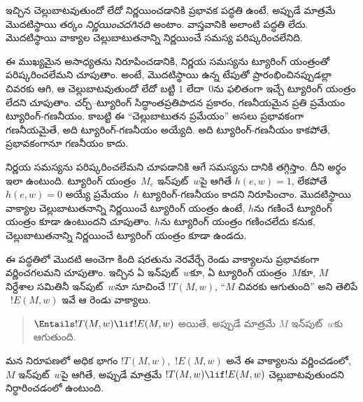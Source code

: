 \documentclass[../../../include/open-logic-section]{subfiles}
\begin{document}

ఇచ్చిన  చెల్లుబాటవుతుందో లేదో నిర్ణయించడానికి ప్రభావక పద్ధతి
ఉంటే, అప్పుడే మాత్రమే మొదటిస్థాయి తర్కం \emph{నిర్ణయించదగినది} అంటాం.
వాస్తవానికి అలాంటి పద్ధతి లేదు. మొదటిస్థాయి వాక్యాల చెల్లుబాటుతనాన్ని
నిర్ణయించే సమస్య పరిష్కరించలేనిది.

ఈ ముఖ్యమైన అసాధ్యతను నిరూపించడానికి, నిర్ణయ సమస్యను ట్యూరింగ్ యంత్రంతో
పరిష్కరించలేమని చూపుతాం. అంటే, మొదటిస్థాయి  ఉన్న టేపుతో
ప్రారంభించినప్పుడల్లా చివరకు ఆగి, ఆ  చెల్లుబాటవుతుందో లేదో
బట్టి $1$ లేదా~$0$ను ఫలితంగా ఇచ్చే ట్యూరింగ్ యంత్రం లేదని చూపుతాం. చర్చ్--ట్యూరింగ్ సిద్ధాంతప్రతిపాదన ప్రకారం, గణనీయమైన ప్రతి ప్రమేయం
ట్యూరింగ్-గణనీయం. కాబట్టి ఈ ``చెల్లుబాటుతన ప్రమేయం'' అసలు ప్రభావకంగా
గణనీయమైతే, అది ట్యూరింగ్-గణనీయం అయ్యేది. అది ట్యూరింగ్-గణనీయం కాకపోతే,
ప్రభావకంగానూ గణనీయం కాదు.

నిర్ణయ సమస్యను పరిష్కరించలేమని చూపడానికి ఆగే సమస్యను దానికి తగ్గిస్తాం.
దీని అర్థం ఇలా ఉంటుంది. ట్యూరింగ్ యంత్రం~$M_e$ ఇన్‌పుట్~$w$పై ఆగితే
$h(e,w)=1$, లేకపోతే $h(e,w)=0$ అయ్యే ప్రమేయం~$h$ ట్యూరింగ్-గణనీయం కాదని
నిరూపించాం. మొదటిస్థాయి వాక్యాల చెల్లుబాటుతనాన్ని నిర్ణయించే ట్యూరింగ్ యంత్రం
ఉంటే, $h$ను గణించే ట్యూరింగ్ యంత్రం కూడా ఉంటుందని చూపుతాం. $h$ను ట్యూరింగ్
యంత్రం గణించలేదు కనుక, చెల్లుబాటుతనాన్ని నిర్ణయించే ట్యూరింగ్ యంత్రం కూడా
ఉండదు.

ఈ పద్ధతిలో మొదటి అంచెగా కింది షరతును నెరవేర్చే రెండు వాక్యాలను ప్రభావకంగా
వర్ణించగలమని చూపుతాం. ఇచ్చిన ఏ ఇన్‌పుట్~$w$కూ, ఏ ట్యూరింగ్ యంత్రం~$M$కూ,
$M$ నిర్దేశాల సమితినీ ఇన్‌పుట్~$w$నూ సూచించే  $!T(M, w)$,
``$M$ చివరకు ఆగుతుంది'' అని తెలిపే ~$!E(M, w)$
ఇవే ఆ రెండు వాక్యాలు.
\begin{quote}
  $\Entails !T(M, w) \lif !E(M,w)$ అయితే, అప్పుడే మాత్రమే $M$ ఇన్‌పుట్~$w$కు
  ఆగుతుంది.
\end{quote}
మన నిరూపణలో అధిక భాగం $!T(M, w)$,~$!E(M, w)$ అనే ఈ వాక్యాలను వర్ణించడంలో,
$M$ ఇన్‌పుట్~$w$పై ఆగితే, అప్పుడే మాత్రమే $!T(M, w) \lif !E(M, w)$
చెల్లుబాటవుతుందని నిర్ధారించడంలో ఉంటుంది.
\end{document}
